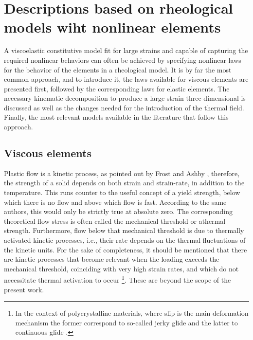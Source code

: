 \section{Descriptions based on rheological models wiht nonlinear elements}

A viscoelastic constitutive model fit for large strains and capable of capturing the required nonlinear behaviors can often be achieved by specifying nonlinear laws for the behavior of the elements in a rheological model.
It is by far the most common approach, and to introduce it, the laws available for viscous elements are presented first, followed by the corresponding laws for elastic elements.
The necessary kinematic decomposition to produce a large strain three-dimensional  is discussed as well as the changes needed for the introduction of the thermal field.
Finally, the most relevant models available in the literature that follow this approach.


\subsection{Viscous elements}
\label{sec:viscous_elements}

Plastic flow is a kinetic process, as pointed out by Frost and Ashby \citep{frostDeformationmechanismMapsPlasticity1982}, therefore, the strength of a solid depends on both strain and strain-rate, in addition to the temperature.
This runs counter to the useful concept of a yield strength, below which there is no flow and above which flow is fast.
According to the same authors, this would only be strictly true at absolute zero.
The corresponding theoretical flow stress is often called the mechanical threshold or athermal strength.
Furthermore, flow below that mechanical threshold is due to thermally activated kinetic processes, i.e., their rate depends on the thermal fluctuations of the kinetic units.
For the sake of completeness, it should be mentioned that there are kinetic processes that become relevant when the loading exceeds the mechanical threshold, coinciding with very high strain rates, and which do not necessitate thermal activation to occur \citep{kocks1975thermodynamics}\footnote{In the context of polycrystalline materials, where slip is the main deformation mechanism the former correspond to so-called jerky glide and the latter to continuous glide \citep{kocks1975thermodynamics}.}.
These are beyond the scope of the present work.

